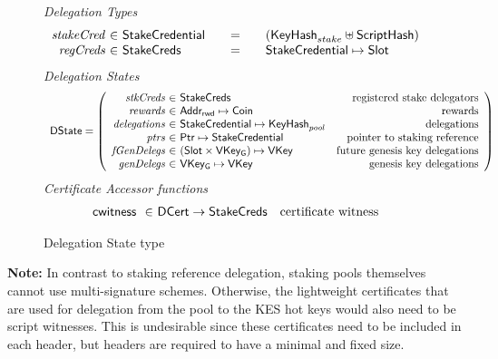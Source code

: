 \documentclass[11pt,a4paper,dvipsnames,twosided]{article}
\newcommand{\khcomment}[1]{\todo[color=blue!20]{KH: #1}}
\newcommand{\Coin}{\type{Coin}}
\newcommand{\Slot}{\type{Slot}}
\newcommand{\StakeCreds}{\type{StakeCreds}}
\newcommand{\StakeObject}{\type{StakeCredential}}
\newcommand{\DCert}{\type{DCert}}
\newcommand{\AddrRWD}{\type{Addr_{rwd}}}
\newcommand{\HashScr}{\type{ScriptHash}}
\newcommand{\Ptr}{\type{Ptr}}
\newcommand{\DState}{\type{DState}}
\newcommand{\VKey}{\type{VKey}}
\newcommand{\VKeyGen}{\type{VKey_G}}
\newcommand{\KeyHash}{\type{KeyHash}}
\newcommand{\cwitness}[1]{\fun{cwitness}~ \var{#1}}
\theoremstyle{definition}
\begin{document}
\begin{figure}
  \emph{Delegation Types}
    \begin{equation*}
      \begin{array}{r@{~\in~}l@{\qquad=\qquad}lr}
        \var{stakeCred} & \StakeObject & (\KeyHash_{stake} \uniondistinct
                                            \HashScr) \\
        \var{regCreds} & \StakeCreds & \StakeObject \mapsto \Slot \\
      \end{array}
    \end{equation*}
  \emph{Delegation States}
  \begin{equation*}
    \begin{array}{l}
    \DState =
    \left(\begin{array}{r@{~\in~}lr}
      \var{stkCreds} & \StakeCreds & \text{registered stake delegators}\\
      \var{rewards} & \AddrRWD \mapsto \Coin & \text{rewards}\\
      \var{delegations} & \StakeObject \mapsto \KeyHash_{pool} & \text{delegations}\\
      \var{ptrs} & \Ptr \mapsto \StakeObject & \text{pointer to staking reference}\\
      \var{fGenDelegs} & (\Slot\times\VKeyGen) \mapsto \VKey & \text{future genesis key delegations}\\
      \var{genDelegs} & \VKeyGen \mapsto \VKey & \text{genesis key delegations}\\
          \end{array}\right)
    \end{array}
  \end{equation*}
  \emph{Certificate Accessor functions}
  \begin{equation*}
  \begin{array}{r@{~\in~}lr}
    \cwitness{} & \DCert \to \StakeCreds & \text{certificate witness}
  \end{array}
  \end{equation*}
  \caption{Delegation State type}
  \label{fig:delegation-state-type}
\end{figure}

\textbf{Note:} In contrast to staking reference delegation, staking pools
themselves cannot use multi-signature schemes. Otherwise, the lightweight
certificates that are used for delegation from the pool to the KES hot keys would also need to be
script witnesses. This is undesirable since these certificates need to be included in each header,
but headers are required to have a minimal and fixed size. %
\end{document}
